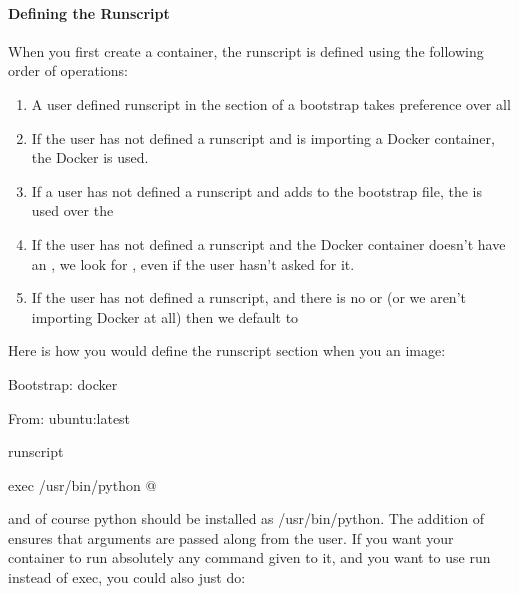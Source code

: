 \documentclass[letterpaper,10pt,english]{sphinxmanual}
\begin{document}
\paragraph{Defining the Runscript}
\label{\detokenize{appendix:defining-the-runscript}}
When you first create a container, the runscript is defined using the
following order of operations:
\begin{enumerate}
\item {} 
A user defined runscript in the  section of a bootstrap takes
preference over all

\item {} 
If the user has not defined a runscript and is importing a Docker
container, the Docker  is used.

\item {} 
If a user has not defined a runscript and adds  to the bootstrap file,
the  is used over the 

\item {} 
If the user has not defined a runscript and the Docker container doesn’t have an , we look for , even if the user hasn’t asked for it.

\item {} 
If the user has not defined a runscript, and there is no  or  (or we
aren’t importing Docker at all) then we default to 

\end{enumerate}

Here is how you would define the runscript section when you {\hyperref[\detokenize{build_a_container:build-a-container}]{}} an image:

%
\begin{sphinxVerbatim}[commandchars=\\\{\}]
Bootstrap: docker

From: ubuntu:latest


\PYGZpc{}runscript

exec /usr/bin/python \PYGZdq{}\PYGZdl{}@\PYGZdq{}
\end{sphinxVerbatim}

and of course python should be installed as /usr/bin/python. The
addition of  ensures that arguments are passed along from the user. If
you want your container to run absolutely any command given to it, and
you want to use run instead of exec, you could also just do:
\end{document}
